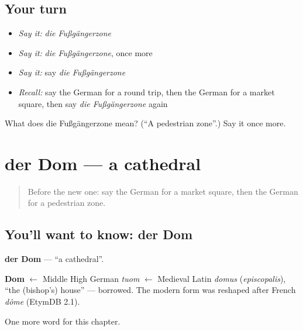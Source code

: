 \subsection*{Your turn}
\begin{itemize}
\raggedright
  \item \emph{Say it:} \emph{die Fußgängerzone}
  \item \emph{Say it:} \emph{die Fußgängerzone}, once more
  \item \emph{Say it:} say \emph{die Fußgängerzone}
  \item \emph{Recall:} say the German for a round trip, then the German for a market square, then say \emph{die Fußgängerzone} again
\end{itemize}

\begin{tcolorbox}[breakable,colback=teal!4,colframe=teal!35!black,title={Before you move on}]
What does die Fußgängerzone mean? (\textquotedblleft{}A pedestrian zone\textquotedblright{}.) Say it once more.
\end{tcolorbox}
\section[der Dom]{der Dom — a cathedral}

\label{lesson:GE-C195-dom}



\begin{quote}
Before the new one: say the German for a market square, then the German for a pedestrian zone.
\end{quote}

\subsection*{You'll want to know: der Dom}
\textbf{der Dom} — \textquotedblleft{}a cathedral\textquotedblright{}.

\begin{cousinweb}
\textbf{Dom} $\leftarrow$ Middle High German \emph{tuom} $\leftarrow$ Medieval Latin \emph{domus} (\emph{episcopalis}), \textquotedblleft{}the (bishop's) house\textquotedblright{} — borrowed. The modern form was reshaped after French \emph{dôme} (EtymDB 2.1).
\end{cousinweb}

\begin{grammarlens}[title={What you've built}]
One more word for this chapter.
\end{grammarlens}

